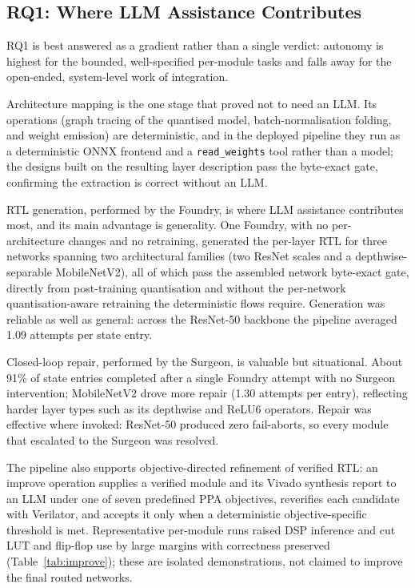 \subsection{RQ1: Where LLM Assistance Contributes}\label{sec:rq1}

RQ1 is best answered as a gradient rather than a single verdict: autonomy is highest for the bounded, well-specified per-module tasks and falls away for the open-ended, system-level work of integration.

Architecture mapping is the one stage that proved not to need an LLM. Its operations (graph tracing of the quantised model, batch-normalisation folding, and weight emission) are deterministic, and in the deployed pipeline they run as a deterministic ONNX frontend and a \texttt{read\_weights} tool rather than a model; the designs built on the resulting layer description pass the byte-exact gate, confirming the extraction is correct without an LLM.

RTL generation, performed by the Foundry, is where LLM assistance contributes most, and its main advantage is generality. One Foundry, with no per-architecture changes and no retraining, generated the per-layer RTL for three networks spanning two architectural families (two ResNet scales and a depthwise-separable MobileNetV2), all of which pass the assembled network byte-exact gate, directly from post-training quantisation and without the per-network quantisation-aware retraining the deterministic flows require. Generation was reliable as well as general: across the ResNet-50 backbone the pipeline averaged 1.09 attempts per state entry.

Closed-loop repair, performed by the Surgeon, is valuable but situational. About 91\% of state entries completed after a single Foundry attempt with no Surgeon intervention; MobileNetV2 drove more repair (1.30 attempts per entry), reflecting harder layer types such as its depthwise and ReLU6 operators. Repair was effective where invoked: ResNet-50 produced zero fail-aborts, so every module that escalated to the Surgeon was resolved.

The pipeline also supports objective-directed refinement of verified RTL: an improve operation supplies a verified module and its Vivado synthesis report to an LLM under one of seven predefined PPA objectives, reverifies each candidate with Verilator, and accepts it only when a deterministic objective-specific threshold is met. Representative per-module runs raised DSP inference and cut LUT and flip-flop use by large margins with correctness preserved (Table~\ref{tab:improve}); these are isolated demonstrations, not claimed to improve the final routed networks.

